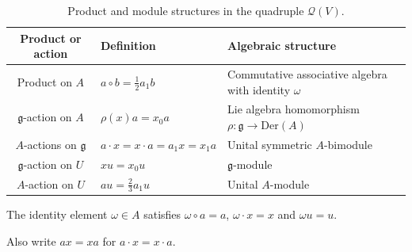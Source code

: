 \documentclass[12pt]{article}
\numberwithin{equation}{section}
\theoremstyle{definition}
\theoremstyle{plain}
\newcommand{\fg}{\mathfrak{g}}
\newcommand{\Der}{\mathrm{Der }}
\newcommand{\cQ}{\ensuremath{\mathcal{Q}}}
\begin{document}
\begingroup
\renewcommand{\arraystretch}{1.40}
\setlength{\tabcolsep}{4pt}
\setlength{\abovecaptionskip}{6pt}
\setlength{\belowcaptionskip}{6pt}
\setlength{\aboverulesep}{3pt}
\setlength{\belowrulesep}{3pt}

\makeatletter
\setlength{\@fptop}{0pt}
\setlength{\@fpsep}{18pt}
\setlength{\@fpbot}{0pt plus 1fil}
\makeatother

\begin{table}[H]
\centering
\small
\linespread{1}\selectfont

\begin{threeparttable}
\caption{Product and module structures in the quadruple $\cQ(V)$.}
\label{tab:product.actions}

\begin{tabularx}{\textwidth}{
    @{}c
    >{\centering\arraybackslash}X
    >{\centering\arraybackslash}X@{}
}
\toprule
Product or action & Definition & Algebraic structure \\
\midrule

Product on $A$
& $a\circ b=\frac12a_1b$
& Commutative associative algebra with identity $\omega$\tnote{1} \\

$\fg$-action on $A$
& $\rho(x)a=x_0a$
& Lie algebra homomorphism $\rho:\fg\to\Der(A)$ \\

$A$-actions on $\fg$
& $a\cdot x=x\cdot a=a_1x=x_1a$\tnote{2}
& Unital symmetric $A$-bimodule \\

$\fg$-action on $U$
& $xu=x_0u$
& $\fg$-module \\

$A$-action on $U$
& $au=\frac23a_1u$
& Unital $A$-module \\

\bottomrule
\end{tabularx}

\begin{tablenotes}
\footnotesize
\item[1] The identity element $\omega\in A$ satisfies
$\omega\circ a=a$, $\omega\cdot x=x$ and $\omega u=u$.
\item[2] Also write $ax=xa$ for $a\cdot x=x\cdot a$.
\end{tablenotes}
\end{threeparttable}
\end{table}
\end{document}
